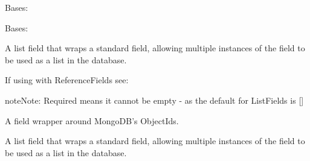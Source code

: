 \documentclass[letterpaper,10pt,english]{sphinxmanual}
\begin{document}
\begin{fulllineitems}
\begin{fulllineitems}
\label{\detokenize{concept_map:concept_map.ConceptMap.DoesNotExist}}
Bases: 

\end{fulllineitems}


\begin{fulllineitems}
\label{\detokenize{concept_map:concept_map.ConceptMap.MultipleObjectsReturned}}
Bases: 

\end{fulllineitems}


\begin{fulllineitems}
\label{\detokenize{concept_map:concept_map.ConceptMap.edges}}
A list field that wraps a standard field, allowing multiple instances
of the field to be used as a list in the database.

If using with ReferenceFields see: 

\begin{sphinxadmonition}{note}{Note:}
Required means it cannot be empty - as the default for ListFields is {[}{]}
\end{sphinxadmonition}

\end{fulllineitems}


\begin{fulllineitems}
\label{\detokenize{concept_map:concept_map.ConceptMap.id}}
A field wrapper around MongoDB's ObjectIds.

\end{fulllineitems}


\begin{fulllineitems}
\label{\detokenize{concept_map:concept_map.ConceptMap.nodes}}
A list field that wraps a standard field, allowing multiple instances
of the field to be used as a list in the database.


\end{fulllineitems}
\end{fulllineitems}
\end{document}
